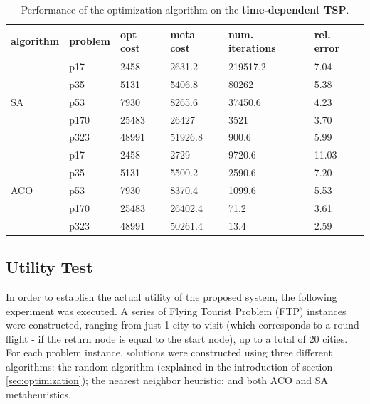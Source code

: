 \begin{table}[]
\centering
\caption{Performance of the optimization algorithm on the \textbf{time-dependent TSP}.}
\label{tab:tdtsp_results}
\begin{tabular}{|l|l|l|l|l|l|}
\hline
algorithm            & problem & opt cost & meta cost & num. iterations & rel. error \\ \hline
\multirow{5}{*}{SA}  & p17     & 2458     & 2631.2    & 219517.2        & 7.04       \\ \cline{2-6} 
                     & p35     & 5131     & 5406.8    & 80262           & 5.38       \\ \cline{2-6} 
                     & p53     & 7930     & 8265.6    & 37450.6         & 4.23       \\ \cline{2-6} 
                     & p170    & 25483    & 26427     & 3521            & 3.70       \\ \cline{2-6} 
                     & p323    & 48991    & 51926.8   & 900.6           & 5.99       \\ \hline
\multirow{5}{*}{ACO} & p17     & 2458     & 2729      & 9720.6          & 11.03      \\ \cline{2-6} 
                     & p35     & 5131     & 5500.2    & 2590.6          & 7.20       \\ \cline{2-6} 
                     & p53     & 7930     & 8370.4    & 1099.6          & 5.53       \\ \cline{2-6} 
                     & p170    & 25483    & 26402.4   & 71.2            & 3.61       \\ \cline{2-6} 
                     & p323    & 48991    & 50261.4   & 13.4            & 2.59       \\ \hline
\end{tabular}
\end{table}




\subsection{Utility Test}

In order to establish the actual utility of the proposed system, the following experiment was executed. A series of Flying Tourist Problem (FTP) instances were constructed, ranging from just 1 city to visit (which corresponds to a round flight - if the return node is equal to the start node), up to a total of 20 cities. For each problem instance, solutions were constructed using three different algorithms: the random algorithm (explained in the introduction of section \ref{sec:optimization}); the nearest neighbor heuristic; and both ACO and SA metaheuristics. 

